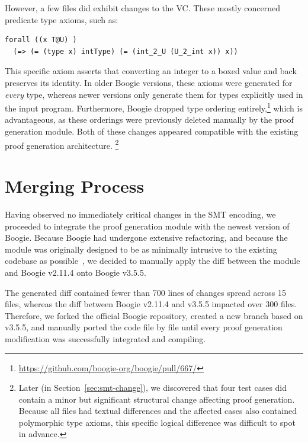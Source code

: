 However, a few files did exhibit changes to the VC.
These mostly concerned predicate type axioms, such as:



\begin{lstlisting}[language=SMT, numbers=none,
caption={SMT type axiom excerpt}]
forall ((x T@U) )
  (=> (= (type x) intType) (= (int_2_U (U_2_int x)) x))
\end{lstlisting}

This specific axiom asserts that converting an integer to a boxed value and back preserves its identity.
In older Boogie versions, these axioms were generated for \emph{every} type, whereas newer versions only generate them for types explicitly used in the input program.
Furthermore, Boogie dropped type ordering entirely,\footnote{\url{https://github.com/boogie-org/boogie/pull/667/}}
which is advantageous, as these orderings were previously deleted manually by the proof generation module.
Both of these changes appeared compatible with the existing proof generation architecture.
\footnote{Later (in Section~\ref{sec:smt-change}), we discovered that four test cases did contain a minor but significant structural change affecting proof generation. Because all files had textual differences and the affected cases also contained polymorphic type axioms, this specific logical difference was difficult to spot in advance.}

\section{Merging Process}

Having observed no immediately critical changes in the SMT encoding, we proceeded to integrate the proof generation module with the newest version of Boogie.
Because Boogie had undergone extensive refactoring, and because the module was originally designed to be as minimally intrusive to the existing codebase as possible~\cite{parthasarathy2021formally},
we decided to manually apply the diff between the module and Boogie v2.11.4 onto Boogie v3.5.5.

The generated diff contained fewer than 700 lines of changes spread across 15 files,
whereas the diff between Boogie v2.11.4 and v3.5.5 impacted over 300 files.
Therefore, we forked the official Boogie repository, created a new branch based on v3.5.5,
and manually ported the code file by file until every proof generation modification was successfully integrated and compiling.

